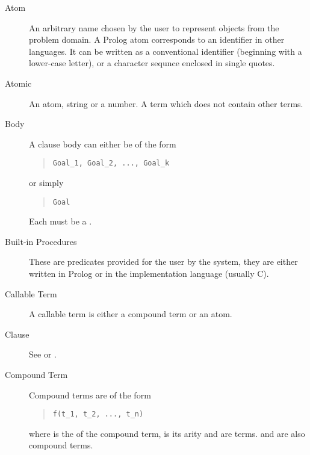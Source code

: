 \begin{description}
\item[Atom]
An arbitrary name chosen by the user to represent objects from the
problem domain.
A Prolog atom corresponds to an identifier in other languages.  It can be
written as a conventional identifier (beginning with a lower-case letter), or
a character sequnce enclosed in single quotes.

\item[Atomic]
An atom, string or a number. A term which does not contain other terms.

\item[Body]
A clause body can either be of the form
\begin{quote}
\begin{verbatim}
Goal_1, Goal_2, ..., Goal_k
\end{verbatim}
\end{quote}
or simply
\begin{quote}
\begin{verbatim}
Goal
\end{verbatim}
\end{quote}
Each  must be a .

\item[Built-in Procedures]
These are predicates provided for the user by the
{\eclipse} system, they are either written in Prolog or in the implementation
language (usually C).

\item[Callable Term]
A callable term is either a compound term or an atom.

\item[Clause]
See  or .

\item[Compound Term]
Compound terms are of the form
\begin{quote}
\begin{verbatim}
f(t_1, t_2, ..., t_n)
\end{verbatim}
\end{quote}
where  is the  of the compound term,  is its
arity and  are terms.
 and  are also compound terms.


\end{description}
